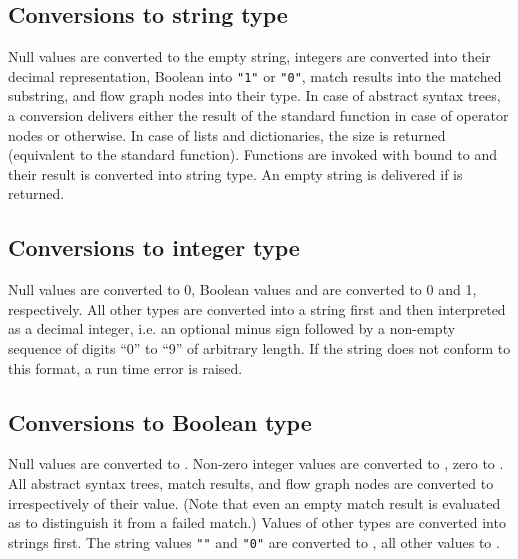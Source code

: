 \subsection{Conversions to string type}\label{functionconv}
\label{stringconv}

Null values are converted to the empty string,
integers are converted into their decimal representation,
Boolean into \lstinline!"1"! or \lstinline!"0"!,
match results into the matched substring, and
flow graph nodes into their type. In case of
abstract syntax trees, a conversion delivers either the result of
the standard function  in case of
operator nodes or  otherwise. In case
of lists and dictionaries, the size is returned (equivalent to the
 standard function). Functions are invoked with
 bound to  and their result is converted
into string type. An empty string is delivered if  is
returned.

\subsection{Conversions to integer type}\label{intconv}

Null values are converted to 0, Boolean values  and
 are converted to 0 and 1, respectively. All other types are
converted into a string first and then interpreted as a decimal integer,
i.e. an optional minus sign followed by a non-empty sequence of digits
``0'' to ``9'' of arbitrary length. If the string does not conform to
this format, a run time error is raised.

\subsection{Conversions to Boolean type}\label{boolconv}

Null values are converted to .
Non-zero integer values are converted to , zero to .
All abstract syntax trees, match results, and flow graph nodes are
converted to  irrespectively of their value. (Note that
even an empty match result is evaluated as  to distinguish
it from a failed match.) Values of other types are converted into
strings first. The string values \lstinline!""! and \lstinline!"0"!
are converted to , all other values to .

